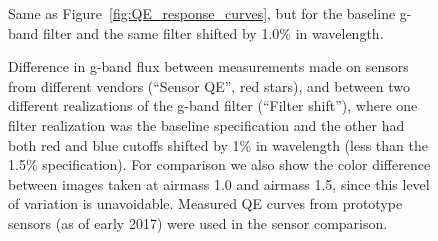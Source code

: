 \documentclass[DM,toc]{lsstdoc}
\begin{document}
\begin{figure}
\caption{Same as Figure~\ref{fig:QE_response_curves}, but for the baseline
g-band filter and the same filter shifted by 1.0\% in wavelength.
\label{fig:filter_response_curves}
}
\end{figure}

\begin{figure}
\caption{Difference in g-band flux between measurements made on sensors from
different vendors (``Sensor QE'', red stars), and between two different
realizations of the g-band filter (``Filter shift''), where one filter
realization was the baseline specification and the other had both red and blue
cutoffs shifted by 1\% in wavelength (less than the 1.5\% specification). For
comparison we also show the color difference between images taken at airmass 1.0
and airmass 1.5, since this level of variation is unavoidable. Measured QE
curves from prototype sensors (as of early 2017) were used in the sensor
comparison.
\label{fig:delta_g_vs_color}}
\end{figure}
\end{document}
